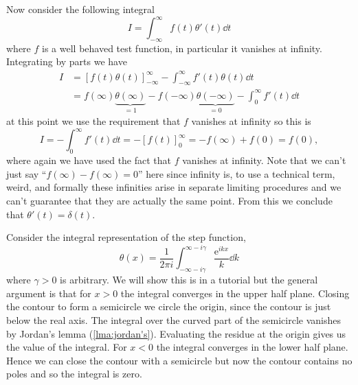 \documentclass[fleqn]{NotesClass}
\newcommand*{\e}{\mathrm{e}}
\begin{document}
    Now consider the following integral
    \begin{equation}
        I = \int_{-\infty}^{\infty} f(t) \theta'(t) \dd{t}
    \end{equation}
    where \(f\) is a well behaved test function, in particular it vanishes at infinity.
    Integrating by parts we have
    \begin{align}
        I &= [f(t)\theta(t)]_{-\infty}^{\infty} - \int_{-\infty}^{\infty} f'(t)\theta(t) \dd{t}\\
        &= f(\infty)\underbrace{\theta(\infty)}_{=1} - f(-\infty)\underbrace{\theta(-\infty)}_{=0} - \int_{0}^{\infty} f'(t) \dd{t}
    \end{align}
    at this point we use the requirement that \(f\) vanishes at infinity so this is
    \begin{equation}
        I = -\int_0^\infty f'(t) \dd{t} = -[f(t)]_{0}^{\infty} = -f(\infty) + f(0) = f(0),
    \end{equation}
    where again we have used the fact that \(f\) vanishes at infinity.
    Note that we can't just say \enquote{\(f(\infty) - f(\infty) = 0\)} here since infinity is, to use a technical term, weird, and formally these infinities arise in separate limiting procedures and we can't guarantee that they are actually the same point.
    From this we conclude that \(\theta'(t) = \delta(t)\).
    
    Consider the integral representation of the step function,
    \begin{equation}
        \theta(x) = \frac{1}{2\pi i} \int_{-\infty - i\gamma}^{\infty - i\gamma} \frac{\e^{ikx}}{k} \dd{k}
    \end{equation}
    where \(\gamma > 0\) is arbitrary.
    We will show this is in a tutorial but the general argument is that for \(x > 0\) the integral converges in the upper half plane.
    Closing the contour to form a semicircle we circle the origin, since the contour is just below the real axis.
    The integral over the curved part of the semicircle vanishes by Jordan's lemma (\cref{lma:jordan's}).
    Evaluating the residue at the origin gives us the value of the integral.
    For \(x < 0\) the integral converges in the lower half plane.
    Hence we can close the contour with a semicircle but now the contour contains no poles and so the integral is zero.
    
\end{document}
